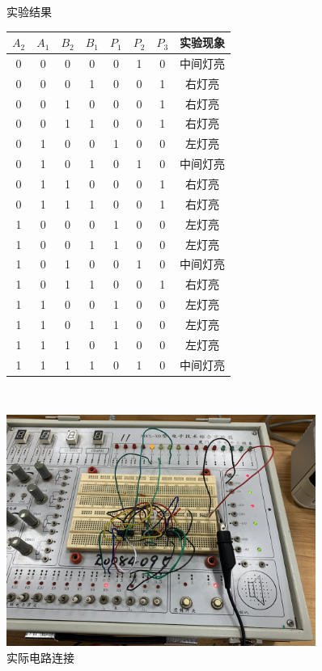 \documentclass[a4paper,twoside]{ctexart}
\begin{document}
\begin{spacing}{1.2}
\begin{figure}[htbp]
	\centering
	\begin{minipage}{0.48\linewidth}
		\caption{实验结果}
		\label{tbl:cmpres}
		\begin{tabular}{cccc|ccc|c}
			\toprule
			\hline
			$A_2$&$A_1$&$B_2$&$B_1$&$P_1$&$P_2$&$P_3$&实验现象 \\
			\hline
			0&0&0&0&0&1&0&中间灯亮 \\
			0&0&0&1&0&0&1&右灯亮 \\
			0&0&1&0&0&0&1&右灯亮 \\
			0&0&1&1&0&0&1&右灯亮 \\
			0&1&0&0&1&0&0&左灯亮 \\
			0&1&0&1&0&1&0&中间灯亮 \\
			0&1&1&0&0&0&1&右灯亮 \\
			0&1&1&1&0&0&1&右灯亮 \\
			1&0&0&0&1&0&0&左灯亮 \\
			1&0&0&1&1&0&0&左灯亮 \\
			1&0&1&0&0&1&0&中间灯亮 \\
			1&0&1&1&0&0&1&右灯亮 \\
			1&1&0&0&1&0&0&左灯亮 \\
			1&1&0&1&1&0&0&左灯亮 \\
			1&1&1&0&1&0&0&左灯亮 \\
			1&1&1&1&0&1&0&中间灯亮 \\
			\hline
			\bottomrule
		\end{tabular}
	\end{minipage}
	~
	\begin{minipage}{0.48\linewidth}
		\centering
		\caption{实际电路连接}
		\label{fig:res22}
		\includegraphics[width=0.9\textwidth,angle=90,origin=c]{fig_res22.jpg}
	\end{minipage}
\end{figure}


\end{spacing}
\end{document}
